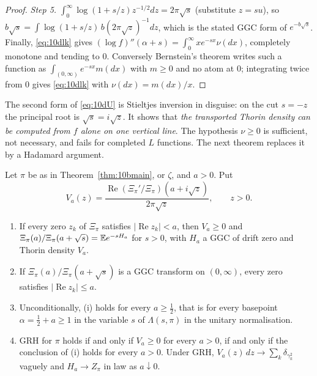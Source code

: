 \begin{proof}
\emph{Step 5.} $\int_0^\infty\log(1+s/z)z^{-1/2}dz = 2\pi\sqrt s$ (substitute $z = su$), so $b\sqrt s = \int\log(1+s/z)\,b(2\pi\sqrt z)^{-1}dz$, which is the stated GGC form of $e^{-b\sqrt s}$. Finally, \eqref{eq:10dlk} gives $(\log f)''(\alpha+s) = \int_0^\infty xe^{-sx}\nu(dx)$, completely monotone and tending to $0$. Conversely Bernstein's theorem writes such a function as $\int_{(0,\infty)}e^{-sx}m(dx)$ with $m\ge0$ and no atom at $0$; integrating twice from $0$ gives \eqref{eq:10dlk} with $\nu(dx) = m(dx)/x$.
\end{proof}

The second form of \eqref{eq:10dU} is Stieltjes inversion in disguise: on the cut $s = -z$ the principal root is $\sqrt s = i\sqrt z$. It shows that \emph{the transported Thorin density can be computed from $f$ alone on one vertical line}. The hypothesis $\nu\ge0$ is sufficient, not necessary, and fails for completed $L$ functions. The next theorem replaces it by a Hadamard argument.

\begin{theorem}\label{thm:10dshift}
Let $\pi$ be as in Theorem~\ref{thm:10bmain}, or $\zeta$, and $a>0$. Put
\[
V_a(z) = \frac{\operatorname{Re}(\Xi_\pi'/\Xi_\pi)(a+i\sqrt z)}{2\pi\sqrt z},\qquad z>0 .
\]
\begin{enumerate}
\item[(i)] If every zero $z_k$ of $\Xi_\pi$ satisfies $|\operatorname{Re}z_k|<a$, then $V_a\ge0$ and $\Xi_\pi(a)/\Xi_\pi(a+\sqrt s) = \mathbb{E} e^{-sH_a}$ for $s>0$, with $H_a$ a GGC of drift zero and Thorin density $V_a$.
\item[(ii)] If $\Xi_\pi(a)/\Xi_\pi(a+\sqrt s)$ is a GGC transform on $(0,\infty)$, every zero satisfies $|\operatorname{Re}z_k|\le a$.
\item[(iii)] Unconditionally, (i) holds for every $a\ge\frac12$, that is for every basepoint $\alpha = \frac12+a\ge1$ in the variable $s$ of $\Lambda(s,\pi)$ in the unitary normalisation.
\item[(iv)] GRH for $\pi$ holds if and only if $V_a\ge0$ for every $a>0$, if and only if the conclusion of (i) holds for every $a>0$. Under GRH, $V_a(z)\,dz\to\sum_k\delta_{\gamma_k^2}$ vaguely and $H_a\to Z_\pi$ in law as $a\downarrow0$.
\end{enumerate}
\end{theorem}

